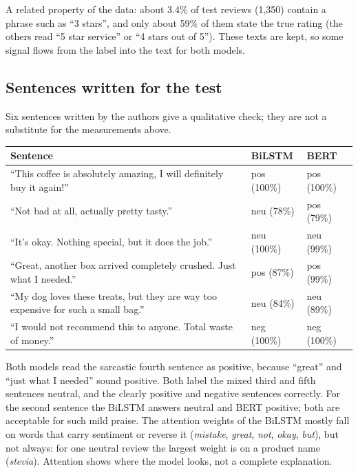 A related property of the data: about 3.4\% of test reviews (1{,}350) contain a phrase such as ``3 stars'', and only about 59\% of them state the true rating (the others read ``5 star service'' or ``4 stars out of 5''). These texts are kept, so some signal flows from the label into the text for both models.

\subsection*{Sentences written for the test}

Six sentences written by the authors give a qualitative check; they are not a substitute for the measurements above.

\begin{center}
\small
\begin{tabular}{@{}p{7.2cm}ll@{}}
    \toprule
    Sentence & BiLSTM & BERT \\
    \midrule
    ``This coffee is absolutely amazing, I will definitely buy it again!'' & pos (100\%) & pos (100\%) \\
    ``Not bad at all, actually pretty tasty.'' & neu (78\%) & pos (79\%) \\
    ``It's okay. Nothing special, but it does the job.'' & neu (100\%) & neu (99\%) \\
    ``Great, another box arrived completely crushed. Just what I needed.'' & pos (87\%) & pos (99\%) \\
    ``My dog loves these treats, but they are way too expensive for such a small bag.'' & neu (84\%) & neu (89\%) \\
    ``I would not recommend this to anyone. Total waste of money.'' & neg (100\%) & neg (100\%) \\
    \bottomrule
\end{tabular}
\end{center}

Both models read the sarcastic fourth sentence as positive, because ``great'' and ``just what I needed'' sound positive. Both label the mixed third and fifth sentences neutral, and the clearly positive and negative sentences correctly. For the second sentence the BiLSTM answers neutral and BERT positive; both are acceptable for such mild praise. The attention weights of the BiLSTM mostly fall on words that carry sentiment or reverse it (\emph{mistake}, \emph{great}, \emph{not}, \emph{okay}, \emph{but}), but not always: for one neutral review the largest weight is on a product name (\emph{stevia}). Attention shows where the model looks, not a complete explanation.

